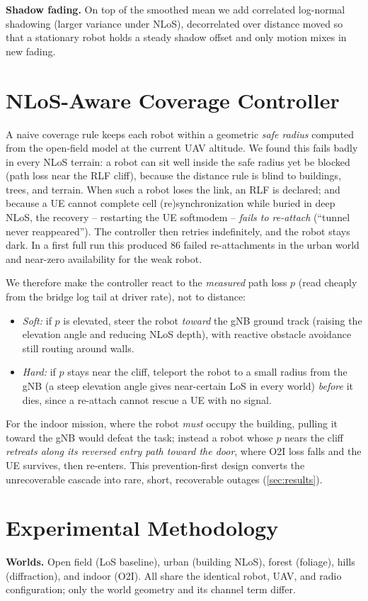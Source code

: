 \documentclass[conference]{IEEEtran}
\begin{document}
\textbf{Shadow fading.} On top of the smoothed mean we add correlated log-normal
shadowing (larger variance under NLoS), decorrelated over distance moved so that a
stationary robot holds a steady shadow offset and only motion mixes in new fading.

\section{NLoS-Aware Coverage Controller}
\label{sec:controller}
A naive coverage rule keeps each robot within a geometric \emph{safe radius}
computed from the open-field model at the current UAV altitude. We found this
fails badly in every NLoS terrain: a robot can sit well inside the safe radius yet
be blocked (path loss near the RLF cliff), because the distance rule is blind to
buildings, trees, and terrain. When such a robot loses the link, an RLF is
declared; and because a UE cannot complete cell (re)synchronization while buried
in deep NLoS, the recovery -- restarting the UE softmodem -- \emph{fails to
re-attach} (``tunnel never reappeared''). The controller then retries
indefinitely, and the robot stays dark. In a first full run this produced $86$
failed re-attachments in the urban world and near-zero availability for the weak
robot.

We therefore make the controller react to the \emph{measured} path loss $p$ (read
cheaply from the bridge log tail at driver rate), not to distance:
\begin{itemize}
  \item \emph{Soft:} if $p$ is elevated, steer the robot \emph{toward} the gNB
  ground track (raising the elevation angle and reducing NLoS depth), with
  reactive obstacle avoidance still routing around walls.
  \item \emph{Hard:} if $p$ stays near the cliff, teleport the robot to a small
  radius from the gNB (a steep elevation angle gives near-certain LoS in every
  world) \emph{before} it dies, since a re-attach cannot rescue a UE with no
  signal.
\end{itemize}
For the indoor mission, where the robot \emph{must} occupy the building, pulling
it toward the gNB would defeat the task; instead a robot whose $p$ nears the cliff
\emph{retreats along its reversed entry path toward the door}, where O2I loss
falls and the UE survives, then re-enters. This prevention-first design converts
the unrecoverable cascade into rare, short, recoverable outages
(\cref{sec:results}).

\section{Experimental Methodology}
\label{sec:method}
\textbf{Worlds.} Open field (LoS baseline), urban (building NLoS), forest
(foliage), hills (diffraction), and indoor (O2I). All share the identical robot,
UAV, and radio configuration; only the world geometry and its channel term differ.
\end{document}
